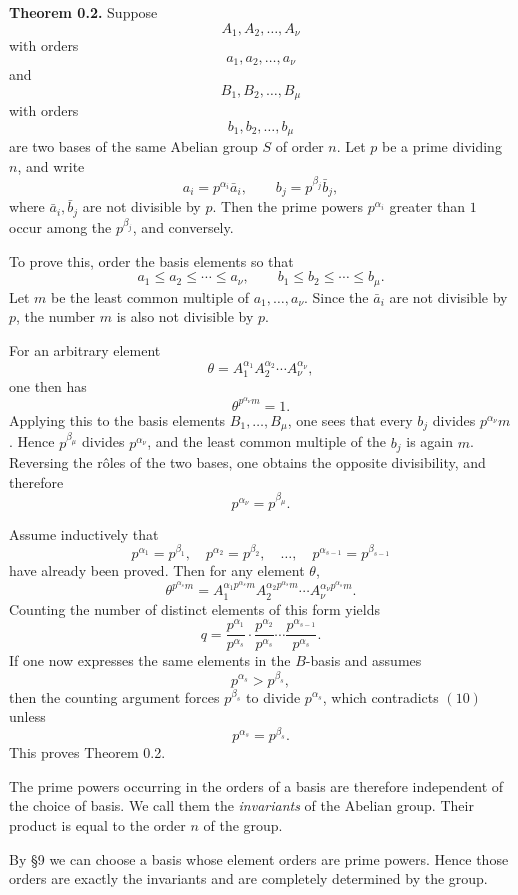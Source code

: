 \documentclass[11pt,a4paper]{book}
\begin{document}
\medskip
\noindent\textbf{Theorem 0.2.}
Suppose
\[
A_1,A_2,\dots,A_\nu
\]
with orders
\[
a_1,a_2,\dots,a_\nu
\]
and
\[
B_1,B_2,\dots,B_\mu
\]
with orders
\[
b_1,b_2,\dots,b_\mu
\]
are two bases of the same Abelian group \(S\) of order \(n\). Let \(p\) be a prime dividing \(n\), and write
\[
a_i=p^{\alpha_i}\bar a_i,\qquad b_j=p^{\beta_j}\bar b_j,
\]
where \(\bar a_i,\bar b_j\) are not divisible by \(p\). Then the prime powers \(p^{\alpha_i}\) greater than \(1\) occur among the \(p^{\beta_j}\), and conversely.

\medskip
To prove this, order the basis elements so that
\[
a_1\leq a_2\leq \cdots\leq a_\nu,\qquad
b_1\leq b_2\leq \cdots\leq b_\mu.
\tag{3}
\]
Let \(m\) be the least common multiple of \(a_1,\dots,a_\nu\). Since the \(\bar a_i\) are not divisible by \(p\), the number \(m\) is also not divisible by \(p\).

For an arbitrary element
\[
\theta=A_1^{\alpha_1}A_2^{\alpha_2}\cdots A_\nu^{\alpha_\nu},
\tag{4}
\]
one then has
\[
\theta^{p^{\alpha_\nu}m}=1.
\]
Applying this to the basis elements \(B_1,\dots,B_\mu\), one sees that every \(b_j\) divides \(p^{\alpha_\nu}m\). Hence \(p^{\beta_\mu}\) divides \(p^{\alpha_\nu}\), and the least common multiple of the \(b_j\) is again \(m\). Reversing the rôles of the two bases, one obtains the opposite divisibility, and therefore
\[
p^{\alpha_\nu}=p^{\beta_\mu}.
\tag{5}
\]

Assume inductively that
\[
p^{\alpha_1}=p^{\beta_1},\quad
p^{\alpha_2}=p^{\beta_2},\quad
\dots,\quad
p^{\alpha_{s-1}}=p^{\beta_{s-1}}
\tag{6}
\]
have already been proved. Then for any element \(\theta\),
\[
\theta^{p^{\alpha_s}m}
=
A_1^{\alpha_1p^{\alpha_s}m}
A_2^{\alpha_2p^{\alpha_s}m}
\cdots
A_\nu^{\alpha_\nu p^{\alpha_s}m}.
\tag{7}
\]
Counting the number of distinct elements of this form yields
\[
q=
\frac{p^{\alpha_1}}{p^{\alpha_s}}
\cdot
\frac{p^{\alpha_2}}{p^{\alpha_s}}
\cdots
\frac{p^{\alpha_{s-1}}}{p^{\alpha_s}}.
\tag{9}
\]
If one now expresses the same elements in the \(B\)-basis and assumes
\[
p^{\alpha_s}>p^{\beta_s},
\tag{10}
\]
then the counting argument forces \(p^{\beta_s}\) to divide \(p^{\alpha_s}\), which contradicts \((10)\) unless
\[
p^{\alpha_s}=p^{\beta_s}.
\tag{14}
\]
This proves Theorem 0.2.

The prime powers occurring in the orders of a basis are therefore independent of the choice of basis. We call them the \emph{invariants} of the Abelian group. Their product is equal to the order \(n\) of the group.

By \S 9 we can choose a basis whose element orders are prime powers. Hence those orders are exactly the invariants and are completely determined by the group.
\end{document}
